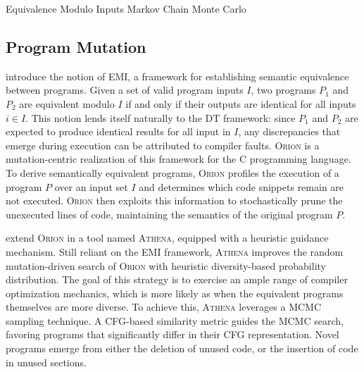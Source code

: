  {Equivalence Modulo Inputs}
 {Markov Chain Monte Carlo}

\subsection{\label{subsec:pm}Program Mutation}

\citet{le2014compiler} introduce the notion of \Gls{EMI},
a framework for establishing semantic equivalence between
programs.
Given a set of valid program inputs $I$,
two programs $P_1$ and $P_2$ are equivalent modulo $I$
if and only if their outputs are identical for all inputs
$i \in I$.
This notion lends itself naturally to the \gls{DT} framework:
since $P_1$ and $P_2$ are expected to produce identical results
for all input in $I$, any discrepancies that emerge during execution
can be attributed to compiler faults.
\textsc{Orion} is a mutation-centric realization of this framework for 
the C programming language.
To derive semantically equivalent programs, \textsc{Orion} profiles the
execution of a program $P$ over an input set $I$ and determines
which code snippets remain are not executed.
\textsc{Orion} then exploits this information to stochastically
prune the unexecuted lines of code, maintaining the semantics of
the original program $P$.

\citet{le2015finding} extend \textsc{Orion} in a tool named \textsc{Athena},
equipped with a heuristic guidance mechanism.
Still reliant on the \gls{EMI} framework, \textsc{Athena} improves
the random mutation-driven search of \textsc{Orion} with heuristic
diversity-based probability distribution.
The goal of this strategy is to exercise an ample range of compiler
optimization mechanics, which is more likely as when the equivalent 
programs themselves are more diverse.
To achieve this, \textsc{Athena} leverages a \Gls{MCMC} sampling technique.
A \Gls{CFG}-based similarity metric guides the \gls{MCMC} search,
favoring programs that significantly differ in their \gls{CFG} representation.
Novel programs emerge from either the deletion of unused code, or the insertion
of code in unused sections.


